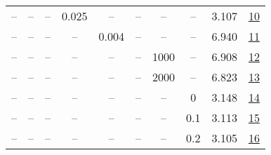 \begin{table}[H]
\begin{tabular}{cccccccccc}
-- & -- & -- & 0.025 & -- & -- & -- & -- & 3.107 & \href{https://wandb.ai/stanford-mercury/optimizer-scaling/runs/sweep-520m-10B-sophia2ff52dlr0.002-wd0.3-minlr0-warmup4000-b10.9-5a41f7}{10} \\
-- & -- & -- & -- & 0.004 & -- & -- & -- & 6.940 & \href{https://wandb.ai/stanford-mercury/optimizer-scaling/runs/sweep-520m-10B-sophiaa0c3e4lr0.004-wd0.3-minlr0-warmup4000-b10.9-44481e}{11} \\
-- & -- & -- & -- & -- & -- & 1000 & -- & 6.908 & \href{https://wandb.ai/stanford-mercury/optimizer-scaling/runs/sweep-520m-10B-sophiaf5bf56lr0.002-wd0.3-minlr0-warmup1000-b10.9-004174}{12} \\
-- & -- & -- & -- & -- & -- & 2000 & -- & 6.823 & \href{https://wandb.ai/stanford-mercury/optimizer-scaling/runs/sweep-520m-10B-sophia9787f8lr0.002-wd0.3-minlr0-warmup2000-b10.9-184312}{13} \\
-- & -- & -- & -- & -- & -- & -- & 0 & 3.148 & \href{https://wandb.ai/stanford-mercury/optimizer-scaling/runs/sweep-520m-10B-sophia803389lr0.002-wd0-minlr0-warmup4000-b10.95--bb80cc}{14} \\
-- & -- & -- & -- & -- & -- & -- & 0.1 & 3.113 & \href{https://wandb.ai/stanford-mercury/optimizer-scaling/runs/sweep-520m-10B-sophia875379lr0.002-wd0.1-minlr0-warmup4000-b10.9-29288d}{15} \\
-- & -- & -- & -- & -- & -- & -- & 0.2 & 3.105 & \href{https://wandb.ai/stanford-mercury/optimizer-scaling/runs/sweep-520m-10B-sophiac53c62lr0.002-wd0.2-minlr0-warmup4000-b10.9-c330ae}{16} \\
\bottomrule
\end{tabular}
\end{table}

